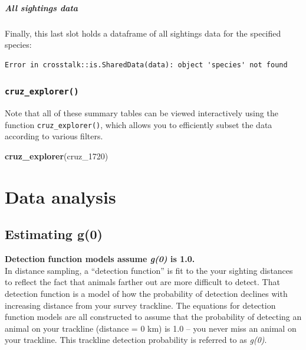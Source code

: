 \documentclass[
]{book}
\newenvironment{Shaded}{\begin{snugshade}}{\end{snugshade}}
\newcommand{\DecValTok}[1]{\textcolor[rgb]{0.00,0.00,0.81}{#1}}
\newcommand{\KeywordTok}[1]{\textcolor[rgb]{0.13,0.29,0.53}{\textbf{#1}}}
\newcommand{\NormalTok}[1]{#1}
\begin{document}
\hypertarget{all-sightings-data}{%
\subsubsection*{All sightings data}\label{all-sightings-data}}

Finally, this last slot holds a dataframe of all sightings data for the specified species:

\begin{verbatim}
Error in crosstalk::is.SharedData(data): object 'species' not found
\end{verbatim}

\hypertarget{cruz_explorer}{%
\section*{\texorpdfstring{\texttt{cruz\_explorer()}}{cruz\_explorer()}}\label{cruz_explorer}}

Note that all of these summary tables can be viewed interactively using the function \texttt{cruz\_explorer()},
which allows you to efficiently subset the data according to various filters.

\begin{Shaded}
\begin{Highlighting}[]
\KeywordTok{cruz_explorer}\NormalTok{(cruz_}\DecValTok{1720}\NormalTok{)}
\end{Highlighting}
\end{Shaded}

\hypertarget{part-data-analysis}{%
\part{Data analysis}\label{part-data-analysis}}

\hypertarget{g0}{%
\chapter{Estimating g(0)}\label{g0}}

\textbf{Detection function models assume \emph{g(0)} is 1.0.}\\
In distance sampling, a ``detection function'' is fit to the your sighting distances to reflect the fact that animals farther out are more difficult to detect. That detection function is a model of how the probability of detection declines with increasing distance from your survey trackline. The equations for detection function models are all constructed to assume that the probability of detecting an animal on your trackline (distance = 0 km) is 1.0 -- you never miss an animal on your trackline. This trackline detection probability is referred to as \emph{g(0)}.
\end{document}
